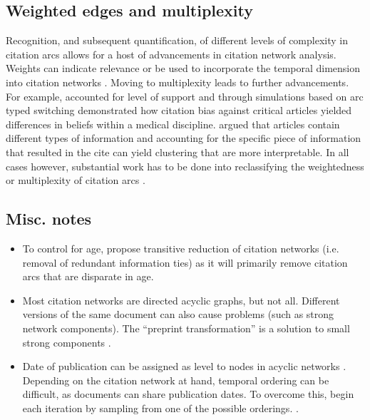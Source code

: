 \documentclass[headsepline=true, abstracton]{scrartcl}
\begin{document}
	\subsection{Weighted edges and multiplexity}
	Recognition, and subsequent quantification, of different levels of complexity in citation arcs allows for a host of advancements in citation network analysis. Weights can indicate relevance \citep{liu2014citations} or be used to incorporate the temporal dimension into citation networks \citep{fujita2014detecting}. Moving to multiplexity leads to further advancements. For example, \citet{greenberg2009citation} accounted for level of support and through simulations based on arc typed switching demonstrated how citation bias against critical articles yielded differences in beliefs within a medical discipline. \citet{bommarito2010distance} argued that articles contain different types of information and accounting for the specific piece of information that resulted in the cite can yield clustering that are more interpretable. In all cases however, substantial work has to be done into reclassifying the weightedness or multiplexity of citation arcs \citep{zhang2007semantics}.
	
	\subsection{Misc. notes}
	\begin{itemize}
		\item To control for age, \citet{clough2015transitive} propose transitive reduction of citation networks (i.e. removal of redundant information ties) as it will primarily remove citation arcs that are disparate in age.
		\item Most citation networks are directed acyclic graphs, but not all. Different versions of the same document can also cause problems (such as strong network components). The ``preprint transformation'' is a solution to small strong components \citep{batagelj2017emergence}.
		\item Date of publication can be assigned as level to nodes in acyclic networks \citep{batagelj2017emergence}. Depending on the citation network at hand, temporal ordering can be difficult, as documents can share publication dates. To overcome this, begin each iteration by sampling from one of the possible orderings. \citep{carstens2016topology}.
	\end{itemize}


 
\end{document}
